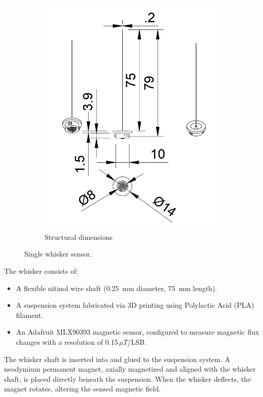 \begin{figure}[ht]
\begin{subfigure}[b]{0.31\textwidth}
        \includegraphics[width=\linewidth]{figures/whisker-dims}
        \caption{Structural dimensions} \label{fig:whisker-dims}
    \end{subfigure}
    \caption{Single whisker sensor.}
    \label{fig:whisker_composite}
\end{figure}

The whisker consists of:
\begin{itemize}
    \item A flexible nitinol wire shaft (\SI{0.25}{\milli\meter} diameter, \SI{75}{\milli\meter} length).
    \item A suspension system fabricated via 3D printing using Polylactic Acid (PLA) filament.
    \item An Adafruit MLX90393 magnetic sensor, configured to measure magnetic flux changes with a resolution of 0.15\,$\mu T$/LSB.
\end{itemize}

The whisker shaft is inserted into and glued to the suspension system.
A neodymium permanent magnet, axially magnetized and aligned with the whisker shaft, is placed directly beneath the suspension.
When the whisker deflects, the magnet rotates, altering the sensed magnetic field.


